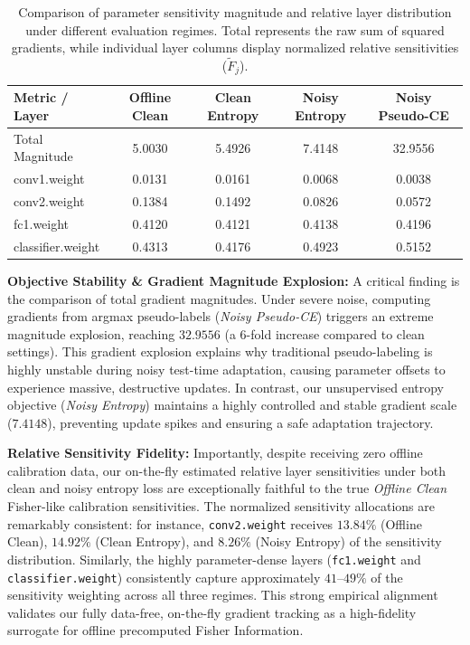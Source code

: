 \documentclass{article}
\theoremstyle{plain}
\theoremstyle{definition}
\theoremstyle{remark}
\begin{document}
\begin{table}[htbp]
  \caption{Comparison of parameter sensitivity magnitude and relative layer distribution under different evaluation regimes. Total represents the raw sum of squared gradients, while individual layer columns display normalized relative sensitivities ($\tilde{F}_j$).}
  \label{tab:sensitivity}
  \vskip 0.15in
  \begin{center}
    \begin{small}
      \begin{tabular}{lcccc}
        \toprule
        Metric / Layer & Offline Clean & Clean Entropy & Noisy Entropy & Noisy Pseudo-CE \\
        \midrule
        Total Magnitude & 5.0030 & 5.4926 & 7.4148 & 32.9556 \\
        \midrule
        conv1.weight & 0.0131 & 0.0161 & 0.0068 & 0.0038 \\
        conv2.weight & 0.1384 & 0.1492 & 0.0826 & 0.0572 \\
        fc1.weight & 0.4120 & 0.4121 & 0.4138 & 0.4196 \\
        classifier.weight & 0.4313 & 0.4176 & 0.4923 & 0.5152 \\
        \bottomrule
      \end{tabular}
    \end{small}
  \end{center}
  \vskip -0.1in
\end{table}

\textbf{Objective Stability \& Gradient Magnitude Explosion:}
A critical finding is the comparison of total gradient magnitudes. Under severe noise, computing gradients from argmax pseudo-labels (\textit{Noisy Pseudo-CE}) triggers an extreme magnitude explosion, reaching $32.9556$ (a 6-fold increase compared to clean settings). This gradient explosion explains why traditional pseudo-labeling is highly unstable during noisy test-time adaptation, causing parameter offsets to experience massive, destructive updates. In contrast, our unsupervised entropy objective (\textit{Noisy Entropy}) maintains a highly controlled and stable gradient scale ($7.4148$), preventing update spikes and ensuring a safe adaptation trajectory.

\textbf{Relative Sensitivity Fidelity:}
Importantly, despite receiving zero offline calibration data, our on-the-fly estimated relative layer sensitivities under both clean and noisy entropy loss are exceptionally faithful to the true \textit{Offline Clean} Fisher-like calibration sensitivities. The normalized sensitivity allocations are remarkably consistent: for instance, \texttt{conv2.weight} receives $13.84\%$ (Offline Clean), $14.92\%$ (Clean Entropy), and $8.26\%$ (Noisy Entropy) of the sensitivity distribution. Similarly, the highly parameter-dense layers (\texttt{fc1.weight} and \texttt{classifier.weight}) consistently capture approximately $41\text{--}49\%$ of the sensitivity weighting across all three regimes. This strong empirical alignment validates our fully data-free, on-the-fly gradient tracking as a high-fidelity surrogate for offline precomputed Fisher Information.
\end{document}

